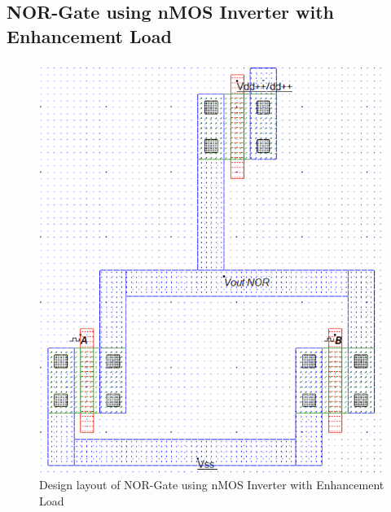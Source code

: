 \documentclass[a4paper,12pt]{article}
\begin{document}
\subsection{NOR-Gate using nMOS Inverter with Enhancement Load}
	\begin{figure}[H]
		\centering
		\includegraphics[width=1\linewidth]{Images5/2}
		\caption{Design layout of NOR-Gate using nMOS Inverter with Enhancement Load}
		\label{fig:1}
	\end{figure}
	
\end{document}
